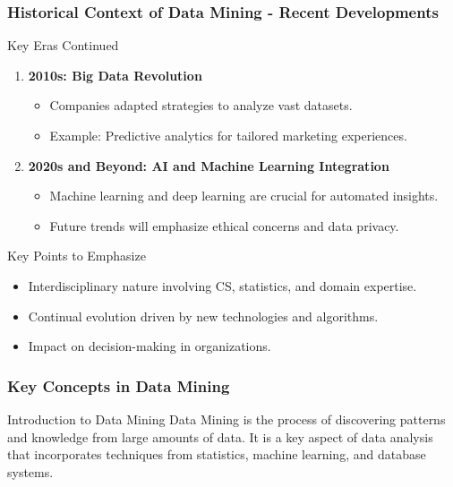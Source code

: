 \documentclass[aspectratio=169]{beamer}
\begin{document}
\begin{frame}[fragile]
    \frametitle{Historical Context of Data Mining - Recent Developments}
    \begin{block}{Key Eras Continued}
        \begin{enumerate}[resume]
            \item \textbf{2010s: Big Data Revolution}
                \begin{itemize}
                    \item Companies adapted strategies to analyze vast datasets.
                    \item Example: Predictive analytics for tailored marketing experiences.
                \end{itemize}
            \item \textbf{2020s and Beyond: AI and Machine Learning Integration}
                \begin{itemize}
                    \item Machine learning and deep learning are crucial for automated insights.
                    \item Future trends will emphasize ethical concerns and data privacy.
                \end{itemize}
        \end{enumerate}
    \end{block}
    \begin{block}{Key Points to Emphasize}
        \begin{itemize}
            \item Interdisciplinary nature involving CS, statistics, and domain expertise.
            \item Continual evolution driven by new technologies and algorithms.
            \item Impact on decision-making in organizations.
        \end{itemize}
    \end{block}
\end{frame}

\begin{frame}[fragile]
    \frametitle{Key Concepts in Data Mining}
    \begin{block}{Introduction to Data Mining}
        Data Mining is the process of discovering patterns and knowledge from large amounts of data. It is a key aspect of data analysis that incorporates techniques from statistics, machine learning, and database systems.
    \end{block}
\end{frame}
\end{document}
